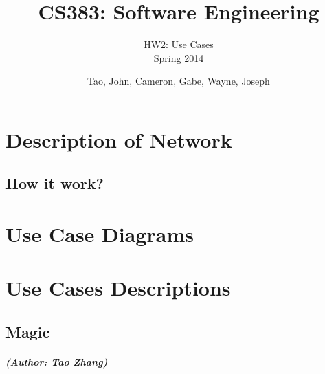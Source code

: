 \documentclass[12pt,letterpaper]{scrreprt}
\title{CS383: Software Engineering}
\subtitle{HW2: Use Cases\\Spring 2014}
\author{Tao, John, Cameron, Gabe, Wayne, Joseph} %
\date{}
\begin{document}
\maketitle
\tableofcontents %

\chapter{Description of Network}
\section{How it work?}



\chapter{Use Case Diagrams}


\chapter{Use Cases Descriptions}

\section{Magic}
\paragraph{(Author: Tao Zhang)}
\end{document}
